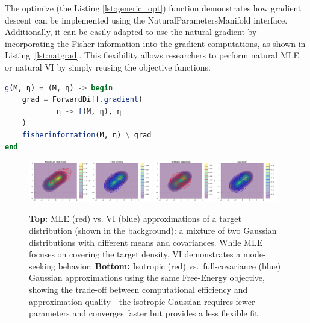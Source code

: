 \documentclass{juliacon}
\newcommand{\dmitry}[2][] {\todo[inline,backgroundcolor=teal!20!white, #1]{(dmitry) #2}}
\newcommand{\code}[1]{\textsf{#1}}
\begin{document}
The \code{optimize} (the Listing \ref{lst:generic_opt}) function demonstrates how gradient descent can be implemented using the \code{NaturalParametersManifold} interface. Additionally, it can be easily adapted to use the natural gradient \cite{amari_natural_1998} by incorporating the Fisher information into the gradient computations, as shown in Listing~\ref{lst:natgrad}. This flexibility allows researchers to perform natural MLE or natural VI by simply reusing the objective functions.

\begin{lstlisting}[language=Julia, label={lst:natgrad}, caption={Implementing the natural gradient}]
g(M, η) = (M, η) -> begin
    grad = ForwardDiff.gradient(
            η -> f(M, η), η
    )
    fisherinformation(M, η) \ grad
end
\end{lstlisting}



\begin{figure}[tb]
   \includegraphics[width=0.48\textwidth]{plots/comparison1.pdf}
   \includegraphics[width=0.48\textwidth]{plots/comparison2.pdf}
   \caption{\textbf{Top:} MLE (red) vs. VI (blue) approximations of a target distribution (shown in the background): a mixture of two Gaussian distributions with different means and covariances. While MLE focuses on covering the target density, VI demonstrates a mode-seeking behavior. \textbf{Bottom:} Isotropic (red) vs.\ full-covariance (blue) Gaussian approximations using the same Free-Energy objective, showing the trade-off between computational efficiency and approximation quality - the isotropic Gaussian requires fewer parameters and converges faster but provides a less flexible fit.}
   \label{fig:comparisons}
\end{figure}
\end{document}
